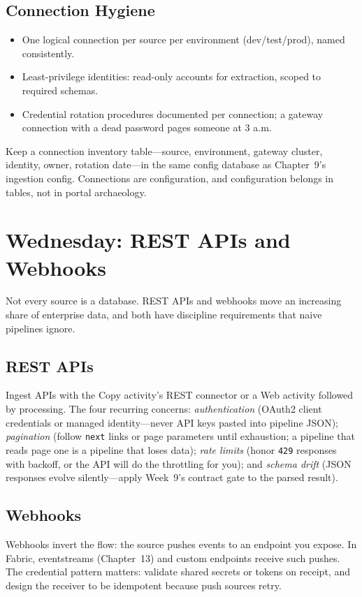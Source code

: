 \subsection{Connection Hygiene}
\begin{itemize}
    \item One logical connection per source per environment (dev/test/prod), named consistently.
    \item Least-privilege identities: read-only accounts for extraction, scoped to required schemas.
    \item Credential rotation procedures documented per connection; a gateway connection with a dead password pages someone at 3 a.m.
\end{itemize}

\begin{tipbox}
Keep a connection inventory table---source, environment, gateway cluster, identity, owner, rotation date---in the same config database as Chapter~9's ingestion config. Connections are configuration, and configuration belongs in tables, not in portal archaeology.
\end{tipbox}

\section{Wednesday: REST APIs and Webhooks}
Not every source is a database. REST APIs and webhooks move an increasing share of enterprise data, and both have discipline requirements that naive pipelines ignore.

\subsection{REST APIs}
Ingest APIs with the Copy activity's REST connector or a Web activity followed by processing. The four recurring concerns: \emph{authentication} (OAuth2 client credentials or managed identity---never API keys pasted into pipeline JSON); \emph{pagination} (follow \texttt{next} links or page parameters until exhaustion; a pipeline that reads page one is a pipeline that loses data); \emph{rate limits} (honor \texttt{429} responses with backoff, or the API will do the throttling for you); and \emph{schema drift} (JSON responses evolve silently---apply Week~9's contract gate to the parsed result).

\subsection{Webhooks}
Webhooks invert the flow: the source pushes events to an endpoint you expose. In Fabric, eventstreams (Chapter~13) and custom endpoints receive such pushes. The credential pattern matters: validate shared secrets or tokens on receipt, and design the receiver to be idempotent because push sources retry.

